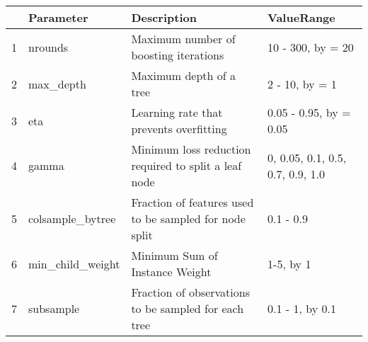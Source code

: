 \begin{table}[ht]
\centering
\begin{tabular}{rlll}
  \hline
 & Parameter & Description & ValueRange \\ 
  \hline
1 & nrounds & Maximum number of boosting iterations & 10 - 300, by = 20 \\ 
  2 & max\_depth & Maximum depth of a tree & 2 - 10, by = 1  \\ 
  3 & eta & Learning rate that prevents overfitting & 0.05 - 0.95, by = 0.05 \\ 
  4 & gamma & Minimum loss reduction required to split a leaf node & 0, 0.05, 0.1, 0.5, 0.7, 0.9, 1.0 \\ 
  5 & colsample\_bytree & Fraction of features used to be sampled for node split & 0.1 - 0.9 \\ 
  6 & min\_child\_weight & Minimum Sum of Instance Weight & 1-5, by 1 \\ 
  7 & subsample & Fraction of observations to be sampled for each tree & 0.1 - 1, by 0.1 \\ 
   \hline
\end{tabular}
\end{table}
